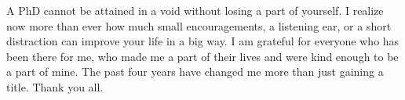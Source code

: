\begin{refsection}
A PhD cannot be attained in a void without losing a part of yourself. I realize now more than ever how much small encouragements, a listening ear, or a short distraction can improve your life in a big way. I am grateful for everyone who has been there for me, who made me a part of their lives and were kind enough to be a part of mine. The past four years have changed me more than just gaining a title. Thank you all.





\end{refsection}
\RemoveLabels